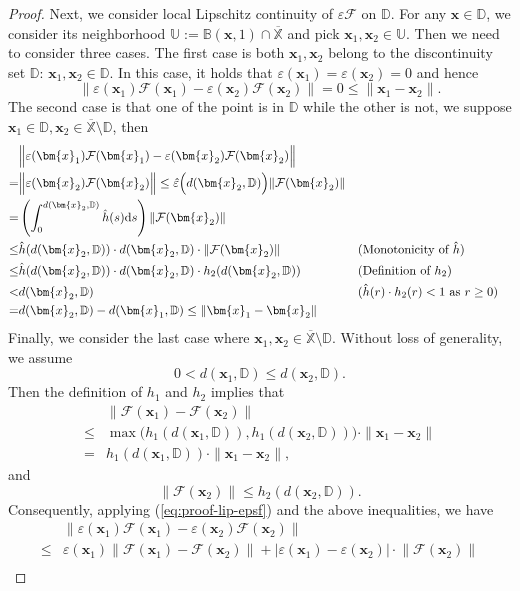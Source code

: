 \documentclass{amsart} %
\def\eqref#1{equation~\ref{#1}}
\def\vx{{\bm{x}}}
\def\sB{{\mathbb{B}}}
\def\sD{{\mathbb{D}}}
\def\sU{{\mathbb{U}}}
\def\sX{{\mathbb{X}}}
\def\cF{{\mathcal{F}}}
\theoremstyle{definition}
\theoremstyle{remark}
\renewcommand{\eqref}[1]{\textup{(\ref{#1})}}
\begin{document}
\begin{proof}
Next, we consider local Lipschitz continuity of $\varepsilon\cF$ on $\sD$. For any $\vx\in\sD$, we consider its neighborhood $\sU:=\sB(\vx,1)\cap\overline{\sX}$ and pick $\vx_1,\vx_2\in \sU$. Then we need to consider three cases. The first case is both $\vx_1,\vx_2$ belong to the discontinuity set $\sD$: $\vx_1,\vx_2\in \sD$. In this case, it holds that $\varepsilon(\vx_1)=\varepsilon(\vx_2)=0$ and hence
$$
\Big\| \varepsilon(\vx_1)\cF(\vx_1) - \varepsilon(\vx_2)\cF(\vx_2) \Big\| = 0 \leq \|\vx_1 - \vx_2\|.
$$
The second case is that one of the point is in $\sD$ while the other is not, we suppose $\vx_1\in\sD,\vx_2\in \overline{\sX}\setminus\sD$, then
\begin{align*}
& \Big\| \varepsilon(\vx_1)\cF(\vx_1) - \varepsilon(\vx_2)\cF(\vx_2) \Big\| \\
= & \Big\|\varepsilon(\vx_2)\cF(\vx_2) \Big\|  \leq \hat{\varepsilon}\Big(d(\vx_2,\sD)\Big)\|\cF(\vx_2)\| \\
 =&  \left(\int_{0}^{d(\vx_2,\sD)}\hat{h}(s) \mathrm{d}s \right) \|\cF(\vx_2)\|\\
 \leq &\hat{h}(d(\vx_2,\sD)) \cdot d(\vx_2,\sD) \cdot \|\cF(\vx_2)\|  && (\textup{Monotonicity of $\hat{h}$}) \\
 \leq& \hat{h}(d(\vx_2,\sD)) \cdot d(\vx_2,\sD) \cdot h_2(d(\vx_2,\sD)) && (\textup{Definition of $h_2$}) \\  
<&  d(\vx_2,\sD) && (\hat{h}(r) \cdot h_2(r) < 1 \textup{ as } r \geq 0)\\
 =& d(\vx_2,\sD) - d(\vx_1,\sD) \leq \|\vx_1-\vx_2\|
\end{align*}
Finally, we consider the last case where $\vx_1,\vx_2\in\overline{\sX}\setminus\sD$. Without loss of generality, we assume \[0<d(\vx_1,\sD)\leq d(\vx_2,\sD).\]
Then the definition of $h_1$ and $h_2$ implies that
\[ 
\begin{aligned}
& \|\cF(\vx_1) - \cF(\vx_2)\|  \\
\leq & \max\Big( h_1(d(\vx_1,\sD)), h_1(d(\vx_2,\sD)) \Big) \cdot \|\vx_1- \vx_2\| \\
= & h_1(d(\vx_1,\sD)) \cdot \|\vx_1- \vx_2\| ,
\end{aligned}
\]
and 
\[ 
\|\cF(\vx_2)\| \leq h_2(d(\vx_2,\sD)).
\]
Consequently, applying \eqref{eq:proof-lip-epsf} and the above inequalities, we have
\begin{align*}
   & \|\varepsilon(\vx_1)\cF(\vx_1) - \varepsilon(\vx_2)\cF(\vx_2)\| \\
   \leq & \varepsilon(\vx_1) \big\|\cF(\vx_1) - \cF(\vx_2)\big\| + |\varepsilon(\vx_1) -\varepsilon(\vx_2)| \cdot \big \|\cF(\vx_2)\big \| \\

\end{align*}
\end{proof}
\end{document}

